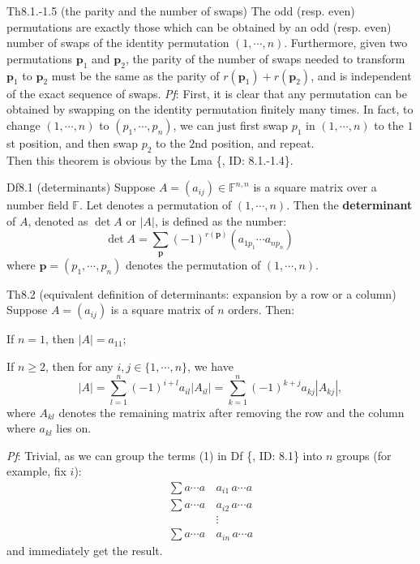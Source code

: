 \documentclass{article}
\begin{document}
\begin{Th}{Th8.1.-1.5 (the parity and the number of swaps)}
    The odd (resp. even) permutations are exactly those which can be obtained by an odd (resp. even) number of swaps of the identity permutation $(1,\cdots,n)$. Furthermore, given two permutations $\pmb{p}_1$ and $\pmb{p}_2$, the parity of the number of swaps needed to transform $\pmb{p}_1$ to $\pmb{p}_2$ must be the same as the parity of $r(\pmb{p}_1)+r(\pmb{p}_2)$, and is independent of the exact sequence of swaps.
    \tcblower
    \textit{Pf}: First, it is clear that any permutation can be obtained by swapping on the identity permutation finitely many times. In fact, to change $(1, \cdots, n)$ to $(p_1, \cdots, p_n)$, we can just first swap $p_1$ in $(1,\cdots, n)$ to the $1$st position, and then swap $p_2$ to the $2$nd position, and repeat. \\
    Then this theorem is obvious by the Lma \{, ID: 8.1.-1.4\}.
\end{Th}

\begin{Df}{Df8.1 (determinants)}
    Suppose $A = (a_{ij})\in \mathbb{F}^{n,n}$ is a square matrix over a number field $\mathbb{F}$. Let denotes a permutation of $(1,\cdots,n)$. Then the \textbf{determinant} of $A$, denoted as $\det A$ or $|A|$, is defined as the number:
    \begin{equation}
        \det A = \sum_{\pmb{p}} (-1)^{r(\pmb{p})} (a_{1p_1}\cdots a_{np_n})\qquad \tag{1}
    \end{equation}
    where $\pmb{p} = (p_1, \cdots, p_n)$ denotes the permutation of $(1,\cdots,n)$.
\end{Df}

\begin{Th}{Th8.2 (equivalent definition of determinants: expansion by a row or a column)}
    Suppose $A = (a_{ij})$ is a square matrix of $n$ orders. Then:
    \begin{compactenum}
        \item If $n=1$, then $|A| = a_{11}$;
        \item If $n\geq 2$, then for any $i,j\in \{1,\cdots,n\}$, we have
        $$ |A| = \sum_{l=1}^{n} (-1)^{i+l} a_{il}|A_{il}| = \sum_{k=1}^{n} (-1)^{k+j} a_{kj}|A_{kj}|, $$
        where $A_{kl}$ denotes the remaining matrix after removing the row and the column where $a_{kl}$ lies on.
    \end{compactenum}
    \tcblower
    \textit{Pf}: Trivial, as we can group the terms (1) in Df \{, ID: 8.1\} into $n$ groups (for example, fix $i$):
    $$
    \begin{aligned}
        \sum a\cdots a\, & a_{i1}\, a\cdots a \\
        \sum a\cdots a\, & a_{i2}\, a\cdots a \\
        &\vdots \\
        \sum a\cdots a\, & a_{in}\, a\cdots a
    \end{aligned}
    $$
    and immediately get the result.
\end{Th}
\end{document}
